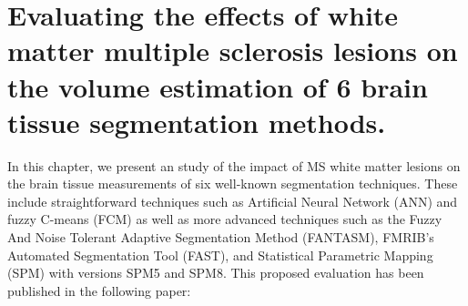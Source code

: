 
\chapter{Evaluating the effects of white matter multiple sclerosis lesions on the volume estimation of 6 brain tissue segmentation
methods.}  
\label{chapter:chapter_3}
In this chapter, we present an study of the impact of MS white matter lesions on the brain tissue measurements of six well-known segmentation techniques. These include straightforward techniques such as Artificial Neural Network (ANN) and fuzzy C-means (FCM) as well as more advanced techniques such as the Fuzzy And Noise Tolerant Adaptive Segmentation Method (FANTASM), FMRIB's Automated Segmentation Tool (FAST), and Statistical Parametric Mapping (SPM) with versions SPM5 and SPM8. This proposed evaluation has been published in the following paper:

\vspace{2cm}

\noindent{}





